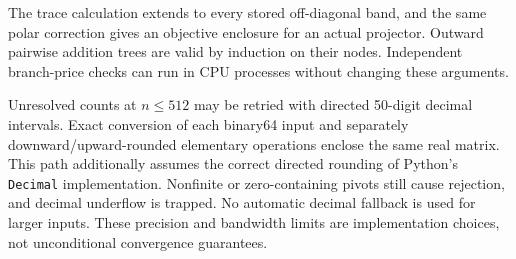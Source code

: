 The trace calculation extends to every stored off-diagonal band, and the
same polar correction gives an objective enclosure for an actual projector.
Outward pairwise addition trees are valid by induction on their nodes.
Independent branch-price checks can run in CPU processes without changing
these arguments.

Unresolved counts at $n\le512$ may be retried with directed 50-digit
decimal intervals. Exact conversion of each binary64 input and separately
downward/upward-rounded elementary operations enclose the same real matrix.
This path additionally assumes the correct directed rounding of Python's
\texttt{Decimal} implementation\cite{pythondecimal}. Nonfinite or zero-containing pivots still
cause rejection, and decimal underflow is trapped. No automatic decimal
fallback is used for larger inputs. These precision and bandwidth limits
are implementation choices, not unconditional convergence guarantees.
